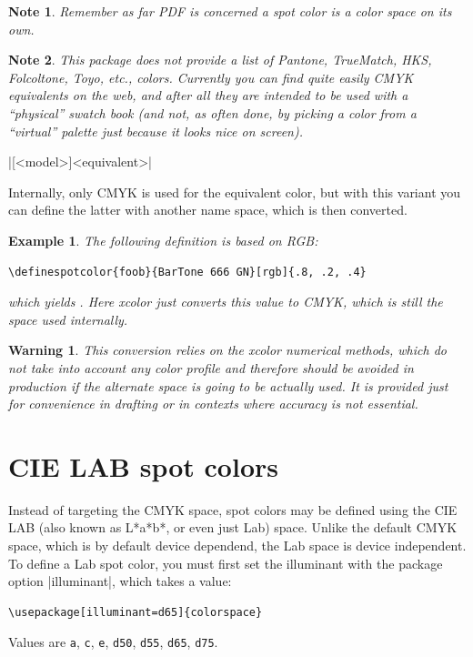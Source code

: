 \documentclass[a4paper]{ltxguide}
\def\showclr#1#{\testclr{#1}}
\def\testclr#1#2{{\fboxsep0pt\fbox{\colorbox#1{#2}{\phantom{,MM}}}}}
\newtheorem{warning}{Warning}
\newtheorem{note}{Note}
\newtheorem{example}{Example}
\begin{document}
\begin{note}
 Remember as far PDF is concerned a spot color is a color space on
 its own.
\end{note}

\begin{note}
  This package does not provide a list of Pantone, TrueMatch, HKS,
  Folcoltone, Toyo, etc., colors. Currently you can find quite easily
  CMYK equivalents on the web, and after all they are intended to be
  used with a ``physical'' swatch book (and not, as often done, by
  picking a color from a ``virtual'' palette just because it looks
  nice on screen).
\end{note}

\begin{decl}
|[<model>]{<equivalent>}|
\end{decl}

Internally, only CMYK is used for the equivalent color, but with this
variant you can define the latter with another name space, which is
then converted.
\begin{example} The following definition is based on RGB:
\begin{verbatim}
\definespotcolor{foob}{BarTone 666 GN}[rgb]{.8, .2, .4}
\end{verbatim}
  which yields .  Here \textsf{xcolor} just
  converts this value to CMYK, which is still the space used
  internally.
\end{example}

\begin{warning}
  This conversion relies on the \textsf{xcolor} numerical methods,
  which do not take into account any color profile and therefore
  should be avoided in production if the alternate space is going to
  be actually used. It is provided just for convenience in drafting or
  in contexts where accuracy is not essential.
\end{warning}

\section{CIE LAB spot colors}

Instead of targeting the CMYK space, spot colors may be defined using
the CIE LAB (also known as L*a*b*, or even just Lab) space. Unlike the
default CMYK space, which is by default device dependend, the Lab
space is device independent. To define a Lab spot color, you must
first set the illuminant with the package option |illuminant|, which
takes a value:
\begin{verbatim}
\usepackage[illuminant=d65]{colorspace}
\end{verbatim}
Values are \texttt{a}, \texttt{c}, \texttt{e}, \texttt{d50},
\texttt{d55}, \texttt{d65}, \texttt{d75}.
\end{document}
